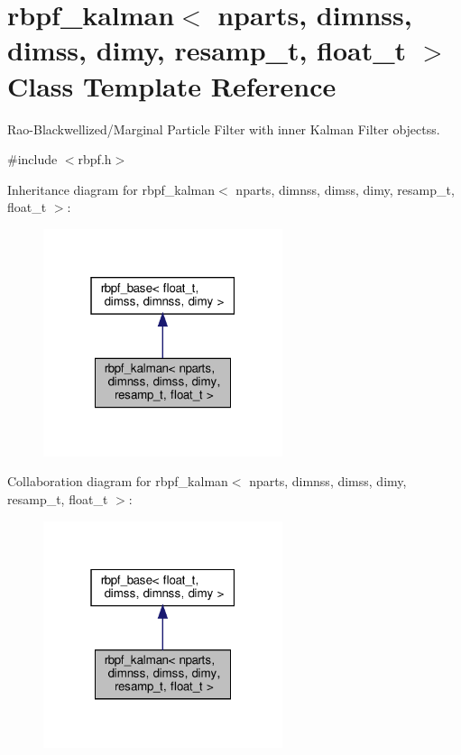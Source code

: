 \hypertarget{classrbpf__kalman}{}\section{rbpf\+\_\+kalman$<$ nparts, dimnss, dimss, dimy, resamp\+\_\+t, float\+\_\+t $>$ Class Template Reference}
\label{classrbpf__kalman}


Rao-\/\+Blackwellized/\+Marginal Particle Filter with inner Kalman Filter objectss.  




{\ttfamily \#include $<$rbpf.\+h$>$}



Inheritance diagram for rbpf\+\_\+kalman$<$ nparts, dimnss, dimss, dimy, resamp\+\_\+t, float\+\_\+t $>$\+:\nopagebreak
\begin{figure}[H]
\begin{center}
\leavevmode
\includegraphics[width=199pt]{classrbpf__kalman__inherit__graph}
\end{center}
\end{figure}


Collaboration diagram for rbpf\+\_\+kalman$<$ nparts, dimnss, dimss, dimy, resamp\+\_\+t, float\+\_\+t $>$\+:\nopagebreak
\begin{figure}[H]
\begin{center}
\leavevmode
\includegraphics[width=199pt]{classrbpf__kalman__coll__graph}
\end{center}
\end{figure}
